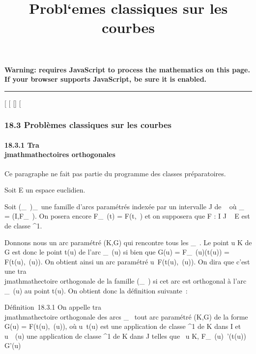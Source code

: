 \documentclass[]{article}
\title{Probl`emes classiques sur les courbes}
\author{}
\date{}
\begin{document}
\maketitle

\textbf{Warning: 
requires JavaScript to process the mathematics on this page.\\ If your
browser supports JavaScript, be sure it is enabled.}

\begin{center}\rule{3in}{0.4pt}\end{center}

{[}
{[}
{[}{]}
{[}

\subsubsection{18.3 Problèmes classiques sur les courbes}

\paragraph{18.3.1 Tra\\jmathmathectoires orthogonales}

Ce paragraphe ne fait pas partie du programme des classes préparatoires.

Soit E un espace euclidien.

Soit (\Gamma_\lambda~)_\lambda~\inJ une famille d'arcs paramétrés indexée
par un intervalle J de ~ où \Gamma_\lambda~ = (I,F_\lambda~). On posera
encore F_\lambda~(t) = F(t,\lambda~) et on supposera que F : I \times J \rightarrow~ E est de
classe ^1.

Donnons nous un arc paramétré (K,G) qui rencontre tous les \Gamma_\lambda~.
Le point u \in K de G est donc le point t(u) de l'arc \Gamma_\lambda~(u) si
bien que G(u) = F_\lambda~(u)(t(u)) = F(t(u),\lambda~(u)). On obtient ainsi
un arc paramétré u\mapsto~F(t(u),\lambda~(u)). On dira que
c'est une tra\\jmathmathectoire orthogonale de la famille (\Gamma_\lambda~) si cet
arc est orthogonal à l'arc \Gamma_\lambda~(u) au point t(u). On obtient
donc la définition suivante~:

Définition~18.3.1 On appelle tra\\jmathmathectoire orthogonale des arcs
\Gamma_\lambda~ tout arc paramétré (K,G) de la forme G(u) = F(t(u),\lambda~(u)),
où u\mapsto~t(u) est une application de classe
^1 de K dans I et u\mapsto~\lambda~(u) une
application de classe ^1 de K dans J telles que
\forall~u \in K, F_\lambda~(u)~'(t(u)) \bot G'(u)
\end{document}
